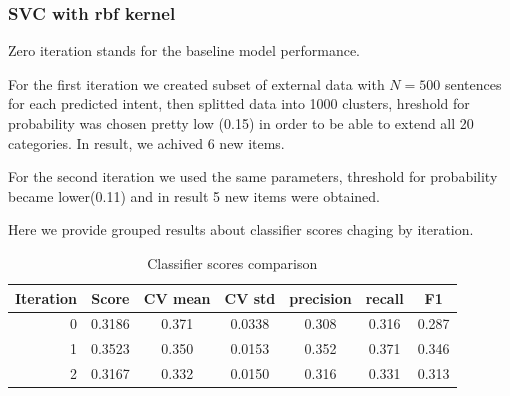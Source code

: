 \documentclass[11pt]{article}
\begin{document}
\subsubsection{SVC with rbf kernel}
\label{subsec:semisupervised-rbf}

Zero iteration stands for the baseline model performance. 

For the first iteration we created subset of external data with $N=500$ sentences for each predicted intent, then splitted data into 1000 clusters, hreshold for probability was chosen pretty low (0.15) in order to be able to extend all 20 categories. In result, we achived 6 new items.

For the second iteration we  used the same parameters, threshold for probability became lower(0.11) and in result 5 new items were obtained.

Here we provide grouped results about classifier scores chaging by iteration. 

\begin{table}[htb]
\begin{center}
\begin{tabular}{ |r|c|c|c|c|c|c| }
\hline
Iteration 	& Score  & CV mean & CV std & precision & recall & F1 \\ \hline
0			& 0.3186 & 0.371   & 0.0338 & 0.308 	& 0.316  & 0.287 \\ \hline
1			& 0.3523 & 0.350   & 0.0153 & 0.352 	& 0.371  & 0.346 \\ \hline
2 			& 0.3167 & 0.332   & 0.0150 & 0.316 	& 0.331  & 0.313 \\ \hline
\end{tabular}
\caption{Classifier scores comparison}
\end{center}
\end{table}
\FloatBarrier
\end{document}
